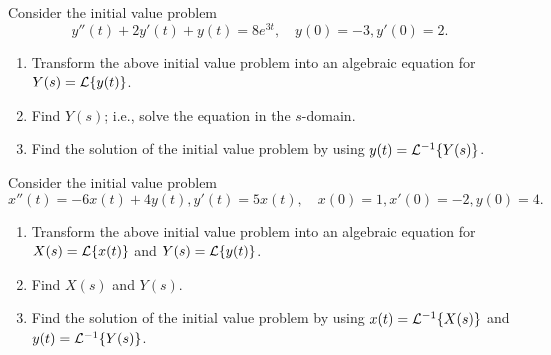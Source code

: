 \item
Consider the initial value problem
$$
y''(t)+2y'(t)+y(t)=8e^{3t}, \quad y(0)=-3, y'(0)=2.
$$
	\begin{enumerate}
	\item
Transform the above initial value problem
 into an algebraic equation for $Y(s)={\cal L}\{y(t)\}$. 
	\item
Find $Y(s)$; i.e., solve the equation in the $s$-domain.
	\item
Find the solution of the initial value problem by using
$y(t)={\cal L}^{-1}\{Y(s)\}$.
	\end{enumerate}

\item
Consider the initial value problem
$$
x''(t)=-6x(t)+4y(t),
y'(t)=5x(t), \quad x(0)=1, x'(0)=-2, y(0)=4.
$$
	\begin{enumerate}
	\item
Transform the above initial value problem
 into an algebraic equation for $X(s)={\cal L}\{x(t)\}$ and $Y(s)={\cal L}\{y(t)\}$. 
	\item
Find $X(s)$ and $Y(s)$.
	\item
Find the solution of the initial value problem by using
$x(t)={\cal L}^{-1}\{X(s)\}$ and
$y(t)={\cal L}^{-1}\{Y(s)\}$.
	\end{enumerate}

